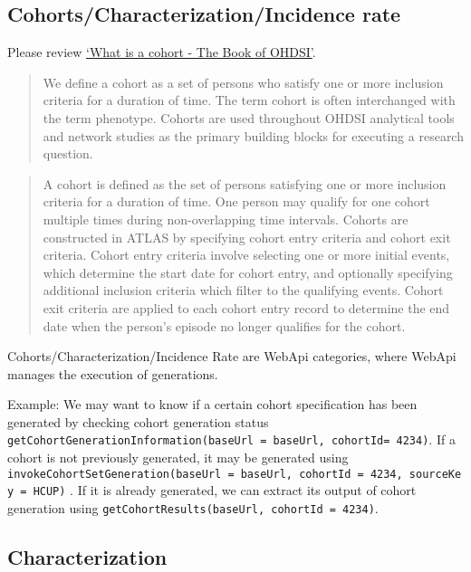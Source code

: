 \documentclass[
]{article}
\begin{document}
\hypertarget{cohortscharacterizationincidence-rate}{%
\subsection{Cohorts/Characterization/Incidence
rate}\label{cohortscharacterizationincidence-rate}}

Please review
\href{https://ohdsi.github.io/TheBookOfOhdsi/Cohorts.html\#what-is-a-cohort}{`What
is a cohort - The Book of OHDSI'}.

\begin{quote}
We define a cohort as a set of persons who satisfy one or more inclusion
criteria for a duration of time. The term cohort is often interchanged
with the term phenotype. Cohorts are used throughout OHDSI analytical
tools and network studies as the primary building blocks for executing a
research question.
\end{quote}

\begin{quote}
A cohort is defined as the set of persons satisfying one or more
inclusion criteria for a duration of time. One person may qualify for
one cohort multiple times during non-overlapping time intervals. Cohorts
are constructed in ATLAS by specifying cohort entry criteria and cohort
exit criteria. Cohort entry criteria involve selecting one or more
initial events, which determine the start date for cohort entry, and
optionally specifying additional inclusion criteria which filter to the
qualifying events. Cohort exit criteria are applied to each cohort entry
record to determine the end date when the person's episode no longer
qualifies for the cohort.
\end{quote}

Cohorts/Characterization/Incidence Rate are WebApi categories, where
WebApi manages the execution of generations.

Example: We may want to know if a certain cohort specification has been
generated by checking cohort generation status
\texttt{getCohortGenerationInformation(baseUrl\ =\ baseUrl,\ cohortId=\ 4234)}.
If a cohort is not previously generated, it may be generated using
\texttt{invokeCohortSetGeneration(baseUrl\ =\ baseUrl,\ cohortId\ =\ 4234,\ sourceKey\ =\ \textquotesingle{}HCUP\textquotesingle{})}
. If it is already generated, we can extract its output of cohort
generation using \texttt{getCohortResults(baseUrl,\ cohortId\ =\ 4234)}.

\hypertarget{characterization}{%
\subsection{Characterization}\label{characterization}}
\end{document}
